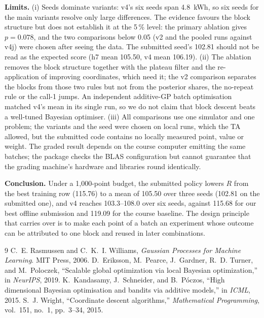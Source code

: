 \documentclass[conference]{IEEEtran}
\begin{document}
\textbf{Limits.} (i) Seeds dominate variants: v4's six seeds span 4.8~kWh, so six seeds for the main variants resolve
only large differences. The evidence favours the block structure but does not establish it at the 5\,\% level: the
primary ablation gives $p=0.078$, and the two comparisons below 0.05 (v2 and the pooled runs against v4j) were chosen
after seeing the data. The submitted seed's 102.81 should not be read as the expected score (h7 mean 105.50, v4 mean
106.19). (ii) The ablation removes the block structure together with the plateau filter and the re-application of
improving coordinates, which need it; the v2 comparison separates the blocks from those two rules but not from the
posterior shares, the no-repeat rule or the call-1 jumps. An independent additive-GP batch optimisation matched v4's mean in its single run, so we do not claim
that block descent beats a well-tuned Bayesian optimiser. (iii) All comparisons use one simulator and one problem; the
variants and the seed were chosen on local runs, which the TA allowed, but the submitted code contains no locally
measured point, value or weight. The graded result depends on the course computer emitting the same batches; the
package checks the BLAS configuration but cannot guarantee that the grading machine's hardware and libraries round
identically.

\textbf{Conclusion.} Under a 1,000-point budget, the submitted policy lowers $R$ from the best training row (115.76)
to a mean of 105.50 over three seeds (102.81 on the submitted one), and v4 reaches 103.3--108.0 over six seeds,
against 115.68 for our best offline submission and 119.09 for the course baseline. The design principle that carries
over is to make each point of a batch an experiment whose outcome can be attributed to one block and reused in later
combinations.


\begin{thebibliography}{9}
 C.~E. Rasmussen and C.~K.~I. Williams, \emph{Gaussian Processes for Machine Learning}. MIT Press, 2006.
 D.~Eriksson, M.~Pearce, J.~Gardner, R.~D. Turner, and M.~Poloczek, ``Scalable global optimization via local Bayesian optimization,'' in \emph{NeurIPS}, 2019.
 K.~Kandasamy, J.~Schneider, and B.~P{\'o}czos, ``High dimensional Bayesian optimisation and bandits via additive models,'' in \emph{ICML}, 2015.
 S.~J. Wright, ``Coordinate descent algorithms,'' \emph{Mathematical Programming}, vol.~151, no.~1, pp.~3--34, 2015.
\end{thebibliography}
\end{document}
